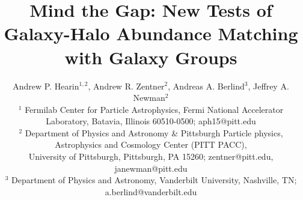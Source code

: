 \documentclass[usenatbib,usegraphicx,letterpaper]{mn2e}
\begin{document}
\title[Mind the Gap]
{Mind the Gap: New Tests of Galaxy-Halo Abundance Matching with Galaxy Groups}

\author[A.P. Hearin et al.]
{Andrew P. Hearin$^{1,2}$,
Andrew R. Zentner$^2$,
Andreas A. Berlind$^3$, 
Jeffrey A. Newman$^2$ \\
$^1$ Fermilab Center for Particle Astrophysics, 
Fermi National Accelerator Laboratory, Batavia, Illinois 60510-0500; aph15@pitt.edu \\
$^2$ Department of Physics and Astronomy \& Pittsburgh Particle physics, Astrophysics and Cosmology Center (PITT PACC),\\ 
University of Pittsburgh, Pittsburgh, PA 15260; zentner@pitt.edu, janewman@pitt.edu\\
$^3$ Department of Physics and Astronomy, Vanderbilt University, Nashville, TN;
a.berlind@vanderbilt.edu
}

\maketitle
\end{document}
